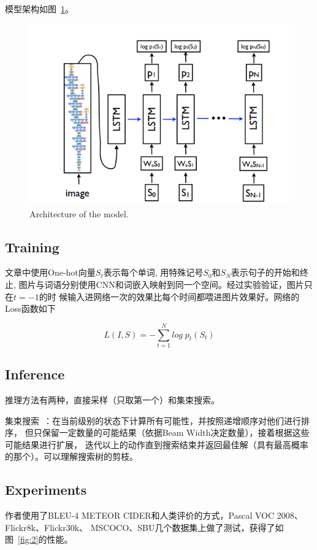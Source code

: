 \documentclass[UTF8]{ctexart}
\begin{document}
模型架构如图~\ref{fig:1}。


\begin{figure}
    \centering
    \includegraphics[width=\textwidth]{dddd}
    \caption{Architecture of the model.}
    \label{fig:1}
\end{figure}

\subsection{Training}

文章中使用One-hot向量$S_t$表示每个单词, 用特殊记号$S_0$和$S_N$表示句子的开始和终止,
图片与词语分别使用CNN和词嵌入映射到同一个空间。经过实验验证，图片只在$t = -1$的时
候输入进网络一次的效果比每个时间都喂进图片效果好。网络的Loss函数如下

\begin{equation}
    L(I,S)=-\sum_{t=1}^N log\;p_t(S_t)
\end{equation}

\subsection{Inference}
推理方法有两种，直接采样（只取第一个）和集束搜索。

集束搜索~\cite{beam}：在当前级别的状态下计算所有可能性，并按照递增顺序对他们进行排序，
但只保留一定数量的可能结果（依据Beam Width决定数量），接着根据这些可能结果进行扩展，
迭代以上的动作直到搜索结束并返回最佳解（具有最高概率的那个）。可以理解搜索树的剪枝。

\subsection{Experiments}
作者使用了BLEU-4 METEOR CIDER和人类评价的方式，Pascal VOC 2008、Flickr8k、Flickr30k、
MSCOCO、SBU几个数据集上做了测试，获得了如图~\ref{fig:2}的性能。
\end{document}
